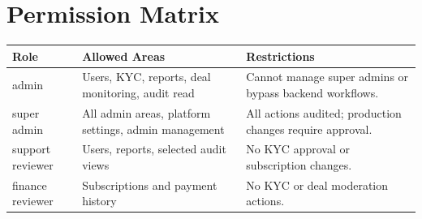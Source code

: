 \section{Permission Matrix}
\begin{longtable}{p{}p{}p{}}
\toprule
Role & Allowed Areas & Restrictions \\
\midrule
admin & Users, KYC, reports, deal monitoring, audit read & Cannot manage super admins or bypass backend workflows. \\
super admin & All admin areas, platform settings, admin management & All actions audited; production changes require approval. \\
support reviewer & Users, reports, selected audit views & No KYC approval or subscription changes. \\
finance reviewer & Subscriptions and payment history & No KYC or deal moderation actions. \\
\bottomrule
\end{longtable}
